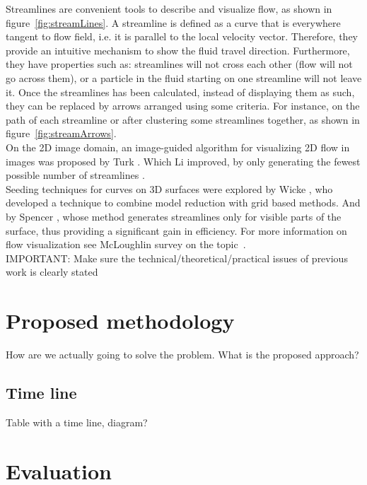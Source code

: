 \documentclass[11pt]{report}
\begin{document}
Streamlines are convenient tools to describe and visualize flow, as shown in figure~\ref{fig:streamLines}.
A streamline is defined as a curve that is everywhere tangent to flow field, i.e. it is parallel to the local velocity vector.
Therefore, they provide an intuitive mechanism to show the fluid travel direction.
Furthermore, they have properties such as: streamlines will not cross each other (flow will not go across them), or a particle in the fluid starting on one streamline will not leave it.
Once the streamlines has been calculated, instead of displaying them as such, they can be replaced by arrows arranged using some criteria.
For instance, on the path of each streamline or after clustering some streamlines together, as shown in figure~\ref{fig:streamArrows}.\\

On the 2D image domain, an image-guided algorithm for visualizing 2D flow in images was proposed by Turk \cite{Turk1996}.
Which Li improved, by only generating the fewest possible number of streamlines \cite{Li2008}. \\

Seeding techniques for curves on 3D surfaces were explored by Wicke \cite{Wicke2009}, who developed a technique to combine model reduction with grid based methods.
And by Spencer \cite{Spencer2009}, whose method generates streamlines only for visible parts of the surface, thus providing a significant gain in efficiency.
For more information on flow visualization see McLoughlin survey on the topic~\cite{McLoughlin2010}.\\


IMPORTANT: Make sure the technical/theoretical/practical issues of previous work is clearly stated 

\chapter{Proposed methodology}

How are we actually going to solve the problem.
What is the proposed approach?

\section{Time line}

Table with a time line, diagram?

\chapter{Evaluation}
\end{document}
